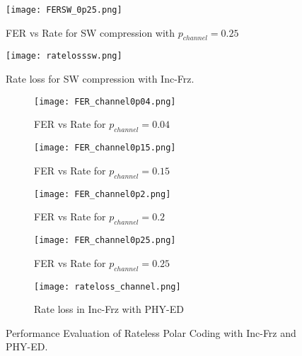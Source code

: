 \documentclass[
11pt, %
a4paper, %
oneside, %
headinclude,footinclude, %
BCOR5mm, %
]{scrartcl}
\begin{document}
\begin{figure}[h!]
 \begin{center}
    \texttt{[image: FERSW\_0p25.png]}
  \end{center}
  \caption{FER vs Rate for SW compression with $p_{channel}=0.25$ }
  \label{fig:fersw4}
\end{figure}
\begin{figure}[h!]
 \begin{center}
    \texttt{[image: ratelosssw.png]}
  \end{center}
  \caption{Rate loss for SW compression with Inc-Frz.}
  \label{fig:rlsw}
\end{figure}
\clearpage
\begin{figure}[h]
\centering
\begin{subfigure}{.5\textwidth}
  \centering
  \texttt{[image: FER\_channel0p04.png]}
  \caption{FER vs Rate for $p_{channel}=0.04$}
  \label{fig:pch1}
\end{subfigure}%
\begin{subfigure}{.5\textwidth}
  \centering
  \texttt{[image: FER\_channel0p15.png]}
  \caption{FER vs Rate for $p_{channel}=0.15$}
  \label{fig:pch2}
\end{subfigure}
\begin{subfigure}{.5\textwidth}
  \centering
  \texttt{[image: FER\_channel0p2.png]}
  \caption{FER vs Rate for $p_{channel}=0.2$}
  \label{fig:pch3}
\end{subfigure}%
\begin{subfigure}{.5\textwidth}
  \centering
  \texttt{[image: FER\_channel0p25.png]}
  \caption{FER vs Rate for $p_{channel}=0.25$}
  \label{fig:pch4}
\end{subfigure}
\begin{subfigure}{.5\textwidth}
  \centering
  \texttt{[image: rateloss\_channel.png]}
  \caption{Rate loss in Inc-Frz with PHY-ED}
  \label{fig:rlch}
\end{subfigure}
\caption{Performance Evaluation of Rateless Polar Coding with Inc-Frz and PHY-ED.}
\label{fig:perfch}
\end{figure}
\clearpage
\end{document}
